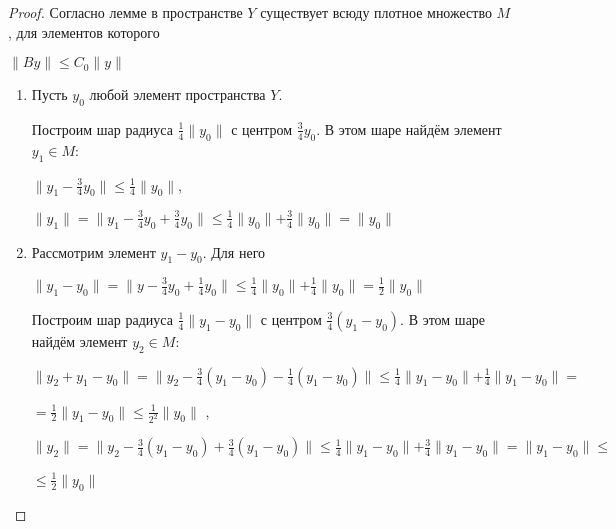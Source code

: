 \documentclass[12pt,a4paper,titlepage,oneside]{book}
\theoremstyle{definition}
\theoremstyle{plain}
\theoremstyle{remark}
\theoremstyle{remark}
\theoremstyle{remark}
\theoremstyle{remark}
\theoremstyle{plain}
\theoremstyle{plain}
\begin{document}
\begin{proof}
Согласно лемме в пространстве $Y$ существует всюду плотное множество $M$, для элементов которого
\begin{center}
	$\parallel By \parallel \leq C_0 \parallel y \parallel $
\end{center}
\begin{enumerate}

	\item Пусть $y_0$ любой элемент пространства $Y$.
	
	Построим шар радиуса $\frac{1}{4}\parallel y_0 \parallel$ с 		центром $\frac{3}{4}y_0$. В этом шаре найдём элемент
	$y_1 \in M$:
	\begin{center}
	$\parallel y_1 - \frac{3}{4}y_0\parallel \leq \frac{1}{4}    		\parallel y_0 \parallel $,
	\end{center}
	\begin{center}
	$\parallel y_1 \parallel =
	\parallel y_1 - \frac{3}{4}y_0 +
	\frac{3}{4}y_0 \parallel \leq \frac{1}{4} 			\parallel y_0 \parallel +
	 \frac{3}{4}\parallel y_0\parallel = 				\parallel y_0 \parallel$
	\end{center}
	
	\item Рассмотрим элемент $y_1 - y_0$. Для него
	\begin{center}
	$\parallel y_1-y_0 \parallel =\parallel y - \frac{3}{4}y_0 +
	\frac{1}{4}y_0 \parallel \leq
	\frac{1}{4} \parallel y_0 \parallel +
	\frac{1}{4} \parallel y_0 \parallel =
	\frac{1}{2} \parallel y_0 \parallel$
	\end{center}
	Построим шар радиуса $\frac{1}{4} \parallel 		y_1 - y_0 \parallel$ с центром $\frac{3}{4} (y_1 - y_0)$. В этом шаре найдём элемент $y_2 \in M$:
	\begin{center}
	$\parallel y_2 + y_1 - y_0 \parallel =
	\parallel y_2 - \frac{3}{4}(y_1 - y_0) -
	\frac{1}{4}(y_1 - y_0) \parallel \leq
	\frac{1}{4} \parallel y_1 - y_0 \parallel +
	\frac{1}{4} \parallel y_1 - y_0 \parallel = $
	\end{center}
	\begin{center}
	$ = \frac{1}{2} \parallel y_1 - y_0 \parallel 			\leq
	\frac{1}{2^2} \parallel y_0 \parallel$ ,
	\end{center}
	\begin{center}
	$\parallel y_2 \parallel =
	\parallel y_2 - \frac{3}{4}(y_1 - y_0) +
	\frac{3}{4}(y_1 - y_0) \parallel \leq
	\frac{1}{4} \parallel y_1 - y_0 \parallel +
	\frac{3}{4} \parallel y_1 - y_0 \parallel =
	 \parallel y_1 - y_0 \parallel \leq$
	 \end{center}
	\begin{center}
	 $ \leq \frac{1}{2} \parallel y_0 \parallel$
	\end{center}
	

\end{enumerate}
\end{proof}
\end{document}
